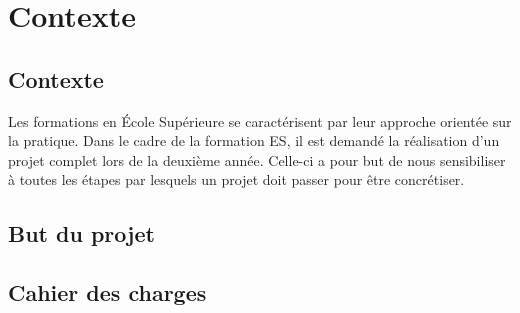 \chapter{Contexte}

\section{Contexte}

    Les formations en École Supérieure se caractérisent par leur approche orientée sur la pratique.
    Dans le cadre de la formation ES, il est demandé la réalisation d'un projet complet lors de la deuxième année. Celle-ci a pour but de nous sensibiliser à toutes les étapes par lesquels un projet doit passer pour être concrétiser.
   
    
\section{But du projet}
    \lipsum[1]

\section{Cahier des charges}

    \lipsum[1]
    \lipsum[1]
    \lipsum[1]